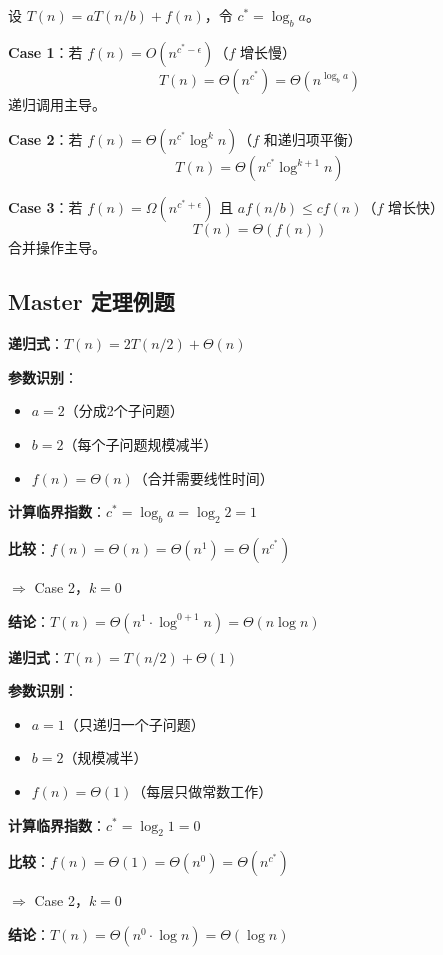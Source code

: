 \documentclass[12pt, a4paper]{ctexart}
\begin{document}
\begin{keypoint}

设 $T(n) = a T(n/b) + f(n)$，令 $c^* = \log_b a$。

\textbf{Case 1}：若 $f(n) = O(n^{c^* - \epsilon})$（$f$ 增长慢）
\[
T(n) = \Theta(n^{c^*}) = \Theta(n^{\log_b a})
\]
递归调用主导。

\textbf{Case 2}：若 $f(n) = \Theta(n^{c^*} \log^k n)$（$f$ 和递归项平衡）
\[
T(n) = \Theta(n^{c^*} \log^{k+1} n)
\]

\textbf{Case 3}：若 $f(n) = \Omega(n^{c^* + \epsilon})$ 且 $af(n/b) \leq cf(n)$（$f$ 增长快）
\[
T(n) = \Theta(f(n))
\]
合并操作主导。

\end{keypoint}

\subsection{Master 定理例题}

\begin{blackboard}

\textbf{递归式}：$T(n) = 2T(n/2) + \Theta(n)$

\textbf{参数识别}：
\begin{itemize}
    \item $a = 2$（分成2个子问题）
    \item $b = 2$（每个子问题规模减半）
    \item $f(n) = \Theta(n)$（合并需要线性时间）
\end{itemize}

\textbf{计算临界指数}：$c^* = \log_b a = \log_2 2 = 1$

\textbf{比较}：$f(n) = \Theta(n) = \Theta(n^1) = \Theta(n^{c^*})$

$\Rightarrow$ Case 2，$k = 0$

\textbf{结论}：$T(n) = \Theta(n^1 \cdot \log^{0+1} n) = \Theta(n \log n)$

\end{blackboard}

\begin{blackboard}

\textbf{递归式}：$T(n) = T(n/2) + \Theta(1)$

\textbf{参数识别}：
\begin{itemize}
    \item $a = 1$（只递归一个子问题）
    \item $b = 2$（规模减半）
    \item $f(n) = \Theta(1)$（每层只做常数工作）
\end{itemize}

\textbf{计算临界指数}：$c^* = \log_2 1 = 0$

\textbf{比较}：$f(n) = \Theta(1) = \Theta(n^0) = \Theta(n^{c^*})$

$\Rightarrow$ Case 2，$k = 0$

\textbf{结论}：$T(n) = \Theta(n^0 \cdot \log n) = \Theta(\log n)$

\end{blackboard}
\end{document}
